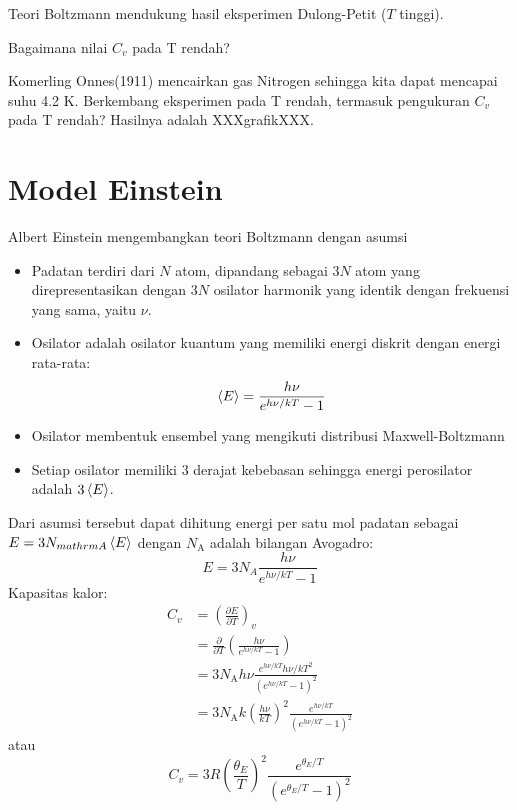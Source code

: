 Teori Boltzmann mendukung hasil eksperimen Dulong-Petit ($T$ tinggi).

Bagaimana nilai $C_{v}$ pada T rendah?

Komerling Onnes(1911) mencairkan gas Nitrogen sehingga kita dapat mencapai
suhu 4.2 K. Berkembang eksperimen pada T rendah, termasuk pengukuran $C_v$
pada T rendah? Hasilnya adalah XXXgrafikXXX.

\section{Model Einstein}

Albert Einstein mengembangkan teori Boltzmann dengan asumsi
\begin{itemize}
\item Padatan terdiri dari $N$ atom, dipandang sebagai $3N$ atom yang direpresentasikan
dengan $3N$ osilator harmonik yang identik dengan frekuensi yang sama, yaitu $\nu$.
\item Osilator adalah osilator kuantum yang memiliki energi diskrit dengan energi
rata-rata:
\begin{equation*}
\braket{E} = \frac{h\nu}{e^{h\nu/kT} - 1}
\end{equation*}
\item Osilator membentuk ensembel yang mengikuti distribusi Maxwell-Boltzmann
\item Setiap osilator memiliki 3 derajat kebebasan sehingga energi perosilator
adalah $3\braket{E}$.
\end{itemize}

Dari asumsi tersebut dapat dihitung energi per satu mol padatan sebagai $E = 3N_{mathrm{A}}\braket{E}$
dengan $N_{\mathrm{A}}$ adalah bilangan Avogadro:
\begin{equation*}
E = 3 N_{A} \frac{h\nu}{e^{h\nu/kT} - 1}
\end{equation*}
Kapasitas kalor:
\begin{align*}
C_{v} & = \left( \frac{\partial E}{\partial T} \right)_{v} \\
& = \frac{\partial}{\partial T}\left(
\frac{h\nu}{e^{h\nu/kT} - 1}
\right) \\
& = 3N_{\mathrm{A}}h\nu
\frac{e^{h\nu/kT} h\nu/kT^2}{(e^{h\nu/kT} - 1)^2} \\
& = 3N_{\mathrm{A}}k \left( \frac{h\nu}{kT} \right)^2
\frac{e^{h\nu/kT}}{(e^{h\nu/kT} - 1)^2}
\end{align*}
atau
\begin{equation}
C_{v} = 3R \left(\frac{\theta_{E}}{T}\right)^2
\frac{e^{\theta_{E}/T}}{(e^{\theta_{E}/T} - 1)^2}
\end{equation}

